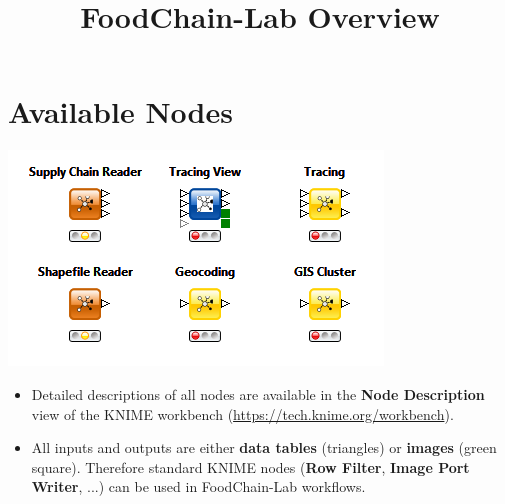 \documentclass{beamer}
\title{FoodChain-Lab Overview}
\date{}
\begin{document}
\maketitle

\section{Available Nodes}
\begin{frame}
	\begin{center}
  		\includegraphics[height=0.4\textheight]{1.png}
	\end{center}
	\begin{itemize}
		\item Detailed descriptions of all nodes are available in the \textbf{Node Description} view of the KNIME workbench (\url{https://tech.knime.org/workbench}).
		\item All inputs and outputs are either \textbf{data tables} (triangles) or \textbf{images} (green square). Therefore standard KNIME nodes (\textbf{Row Filter}, \textbf{Image Port Writer}, ...) can be used in FoodChain-Lab workflows.		
	\end{itemize}
\end{frame}
 
\end{document}
